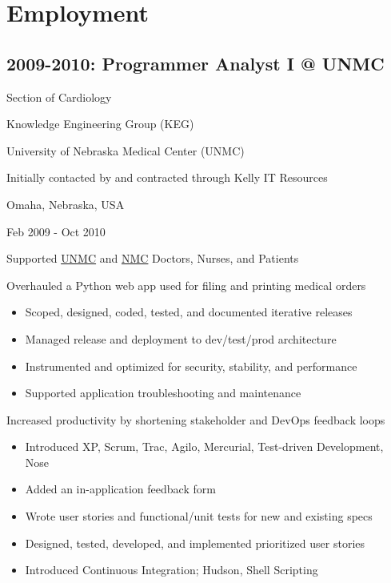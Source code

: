 \documentclass[letter,,openany,oneside]{sphinxhowto}
\begin{document}
\section{Employment}
\label{resume:employment}

\subsection{2009-2010: Programmer Analyst I @ UNMC}
\label{resume:programmer-analyst-i-unmc}
\begin{DUlineblock}{0em}
\item[] Section of Cardiology
\item[] Knowledge Engineering Group (KEG)
\item[] University of Nebraska Medical Center (UNMC)
\item[] Initially contacted by and contracted through Kelly IT Resources
\item[] Omaha, Nebraska, USA
\item[] Feb 2009 - Oct 2010
\end{DUlineblock}

Supported \href{https://en.wikipedia.org/wiki/University\_of\_Nebraska\_Medical\_Center}{UNMC}
and \href{https://en.wikipedia.org/wiki/Nebraska\_Medical\_Center}{NMC}
Doctors, Nurses, and Patients

Overhauled a Python web app used for filing and printing medical orders
\begin{itemize}
\item {} 
Scoped, designed, coded, tested, and documented iterative releases

\item {} 
Managed release and deployment to dev/test/prod architecture

\item {} 
Instrumented and optimized for security, stability, and performance

\item {} 
Supported application troubleshooting and maintenance

\end{itemize}

Increased productivity by shortening stakeholder and DevOps feedback loops
\begin{itemize}
\item {} 
Introduced XP, Scrum, Trac, Agilo, Mercurial, Test-driven Development, Nose

\item {} 
Added an in-application feedback form

\item {} 
Wrote user stories and functional/unit tests for new and existing specs

\item {} 
Designed, tested, developed, and implemented prioritized user stories

\item {} 
Introduced Continuous Integration; Hudson, Shell Scripting

\end{itemize}
\end{document}
